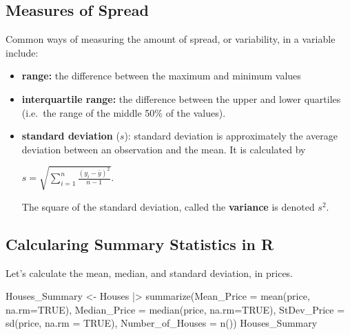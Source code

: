 \documentclass[
  letterpaper,
  DIV=11,
  numbers=noendperiod]{scrreprt}
\newenvironment{Shaded}{\begin{snugshade}}{\end{snugshade}}
\newcommand{\AttributeTok}[1]{\textcolor[rgb]{0.40,0.45,0.13}{#1}}
\newcommand{\ConstantTok}[1]{\textcolor[rgb]{0.56,0.35,0.01}{#1}}
\newcommand{\FunctionTok}[1]{\textcolor[rgb]{0.28,0.35,0.67}{#1}}
\newcommand{\NormalTok}[1]{\textcolor[rgb]{0.00,0.23,0.31}{#1}}
\newcommand{\OtherTok}[1]{\textcolor[rgb]{0.00,0.23,0.31}{#1}}
\newcommand{\SpecialCharTok}[1]{\textcolor[rgb]{0.37,0.37,0.37}{#1}}
\begin{document}
\subsection{Measures of Spread}\label{measures-of-spread}

Common ways of measuring the amount of spread, or variability, in a
variable include:

\begin{itemize}
\item
  \textbf{range:} the difference between the maximum and minimum values
\item
  \textbf{interquartile range:} the difference between the upper and
  lower quartiles (i.e.~the range of the middle 50\% of the values).
\item
  \textbf{standard deviation} (\(s\)): standard deviation is
  approximately the average deviation between an observation and the
  mean. It is calculated by

  \(s =\sqrt{\displaystyle\sum_{i=1}^n \frac{(y_i-\bar{y})^2}{n-1}}\).

  The square of the standard deviation, called the \textbf{variance} is
  denoted \(s^2\).
\end{itemize}

\subsection{Calcularing Summary Statistics in
R}\label{calcularing-summary-statistics-in-r}

Let's calculate the mean, median, and standard deviation, in prices.

\begin{Shaded}
\begin{Highlighting}[]
\NormalTok{Houses\_Summary }\OtherTok{\textless{}{-}}\NormalTok{ Houses }\SpecialCharTok{|\textgreater{}} \FunctionTok{summarize}\NormalTok{(}\AttributeTok{Mean\_Price =} \FunctionTok{mean}\NormalTok{(price, }\AttributeTok{na.rm=}\ConstantTok{TRUE}\NormalTok{), }
                                          \AttributeTok{Median\_Price =} \FunctionTok{median}\NormalTok{(price, }\AttributeTok{na.rm=}\ConstantTok{TRUE}\NormalTok{), }
                                          \AttributeTok{StDev\_Price =} \FunctionTok{sd}\NormalTok{(price, }\AttributeTok{na.rm =} \ConstantTok{TRUE}\NormalTok{),}
                                          \AttributeTok{Number\_of\_Houses =} \FunctionTok{n}\NormalTok{()) }
\NormalTok{Houses\_Summary}
\end{Highlighting}
\end{Shaded}
\end{document}
